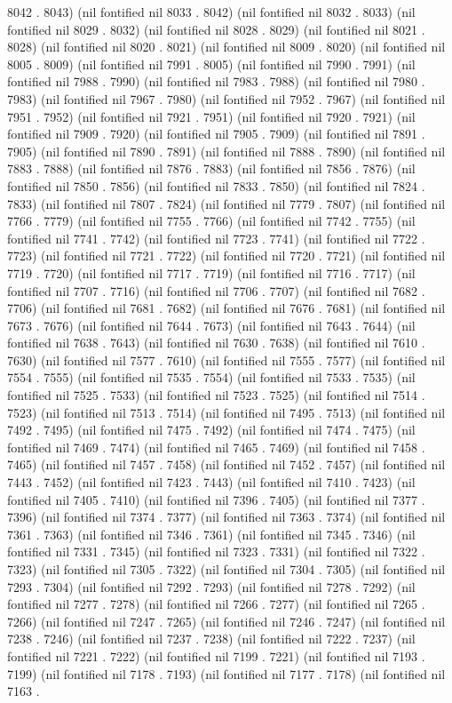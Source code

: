 8042 . 8043) (nil fontified nil 8033 . 8042) (nil fontified nil 8032 . 8033) (nil fontified nil 8029 . 8032) (nil fontified nil 8028 . 8029) (nil fontified nil 8021 . 8028) (nil fontified nil 8020 . 8021) (nil fontified nil 8009 . 8020) (nil fontified nil 8005 . 8009) (nil fontified nil 7991 . 8005) (nil fontified nil 7990 . 7991) (nil fontified nil 7988 . 7990) (nil fontified nil 7983 . 7988) (nil fontified nil 7980 . 7983) (nil fontified nil 7967 . 7980) (nil fontified nil 7952 . 7967) (nil fontified nil 7951 . 7952) (nil fontified nil 7921 . 7951) (nil fontified nil 7920 . 7921) (nil fontified nil 7909 . 7920) (nil fontified nil 7905 . 7909) (nil fontified nil 7891 . 7905) (nil fontified nil 7890 . 7891) (nil fontified nil 7888 . 7890) (nil fontified nil 7883 . 7888) (nil fontified nil 7876 . 7883) (nil fontified nil 7856 . 7876) (nil fontified nil 7850 . 7856) (nil fontified nil 7833 . 7850) (nil fontified nil 7824 . 7833) (nil fontified nil 7807 . 7824) (nil fontified nil 7779 . 7807) (nil fontified nil 7766 . 7779) (nil fontified nil 7755 . 7766) (nil fontified nil 7742 . 7755) (nil fontified nil 7741 . 7742) (nil fontified nil 7723 . 7741) (nil fontified nil 7722 . 7723) (nil fontified nil 7721 . 7722) (nil fontified nil 7720 . 7721) (nil fontified nil 7719 . 7720) (nil fontified nil 7717 . 7719) (nil fontified nil 7716 . 7717) (nil fontified nil 7707 . 7716) (nil fontified nil 7706 . 7707) (nil fontified nil 7682 . 7706) (nil fontified nil 7681 . 7682) (nil fontified nil 7676 . 7681) (nil fontified nil 7673 . 7676) (nil fontified nil 7644 . 7673) (nil fontified nil 7643 . 7644) (nil fontified nil 7638 . 7643) (nil fontified nil 7630 . 7638) (nil fontified nil 7610 . 7630) (nil fontified nil 7577 . 7610) (nil fontified nil 7555 . 7577) (nil fontified nil 7554 . 7555) (nil fontified nil 7535 . 7554) (nil fontified nil 7533 . 7535) (nil fontified nil 7525 . 7533) (nil fontified nil 7523 . 7525) (nil fontified nil 7514 . 7523) (nil fontified nil 7513 . 7514) (nil fontified nil 7495 . 7513) (nil fontified nil 7492 . 7495) (nil fontified nil 7475 . 7492) (nil fontified nil 7474 . 7475) (nil fontified nil 7469 . 7474) (nil fontified nil 7465 . 7469) (nil fontified nil 7458 . 7465) (nil fontified nil 7457 . 7458) (nil fontified nil 7452 . 7457) (nil fontified nil 7443 . 7452) (nil fontified nil 7423 . 7443) (nil fontified nil 7410 . 7423) (nil fontified nil 7405 . 7410) (nil fontified nil 7396 . 7405) (nil fontified nil 7377 . 7396) (nil fontified nil 7374 . 7377) (nil fontified nil 7363 . 7374) (nil fontified nil 7361 . 7363) (nil fontified nil 7346 . 7361) (nil fontified nil 7345 . 7346) (nil fontified nil 7331 . 7345) (nil fontified nil 7323 . 7331) (nil fontified nil 7322 . 7323) (nil fontified nil 7305 . 7322) (nil fontified nil 7304 . 7305) (nil fontified nil 7293 . 7304) (nil fontified nil 7292 . 7293) (nil fontified nil 7278 . 7292) (nil fontified nil 7277 . 7278) (nil fontified nil 7266 . 7277) (nil fontified nil 7265 . 7266) (nil fontified nil 7247 . 7265) (nil fontified nil 7246 . 7247) (nil fontified nil 7238 . 7246) (nil fontified nil 7237 . 7238) (nil fontified nil 7222 . 7237) (nil fontified nil 7221 . 7222) (nil fontified nil 7199 . 7221) (nil fontified nil 7193 . 7199) (nil fontified nil 7178 . 7193) (nil fontified nil 7177 . 7178) (nil fontified nil 7163 . 